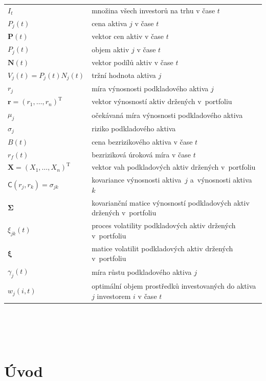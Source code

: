 \documentclass[a4paper,12pt]{report}
\theoremstyle{definition} \newtheorem{definice}[veta]{Definice}
\theoremstyle{remark}
\begin{document}
   \begin{tabular}{p{4cm} p{9.3cm}}
   $I_t$ 								& množina všech investorů na trhu v čase $t$\\
   $P_j(t)$                             &   cena aktiva $j$ v čase $t$ \\
   $\boldsymbol{P}(t)$                             &   vektor cen aktiv v čase $t$\\
   $P_j(t)$                             &   objem aktiv $j$ v čase $t$ \\
   $\boldsymbol{N}(t)$     &   vektor podílů aktiv v čase $t$\\
   $V_j(t)=P_j(t)N_j(t)$       &  tržní hodnota aktiva $j$\\
   $r_j$  								& míra výnosnosti podkladového aktiva $j$\\
   $\boldsymbol{r}=(r_1,\dots,r_n)^\mathrm{T}$  		& vektor výnosností aktiv držených v~portfoliu\\
   $\mu_j$ 								& očekávaná míra výnosnosti podkladového aktiva\\
   $\sigma_j$								& riziko podkladového aktiva\\
   $B(t)$ 								& cena bezrizikového aktiva v čase $t$\\
   $r_f(t)$ 								& bezriziková úroková míra v čase $t$\\
   $\boldsymbol{X}=(X_1,\dots,X_n)^\mathrm{T}$		& vektor vah podkladových aktiv držených v~portfoliu\\
   $\mathsf{C}(r_j,r_k)=\sigma_{jk}$				& kovariance výnosnosti aktiva~$j$ a~výnosnosti aktiva~$k$\\
   $\boldsymbol{\Sigma}$						& kovarianční matice výnosností podkladových aktiv držených v~portfoliu\\
   $\xi_{jk}(t)$ 							& proces volatility podkladových aktiv držených v~portfoliu\\
   $\boldsymbol{\xi}$						& matice volatilit podkladových aktiv držených v~portfoliu\\
   $\gamma_j(t)$ 							& míra růstu  podkladového aktiva $j$\\
   $w_{j}(i,t)$ 							& optimální objem prostředků investovaných do aktiva $j$ investorem $i$ v čase $t$\\
   \end{tabular}\\\\\\
%
%
%


\chapter{Úvod}
\pagestyle{plain}
\setcounter{page}{1}
\end{document}
